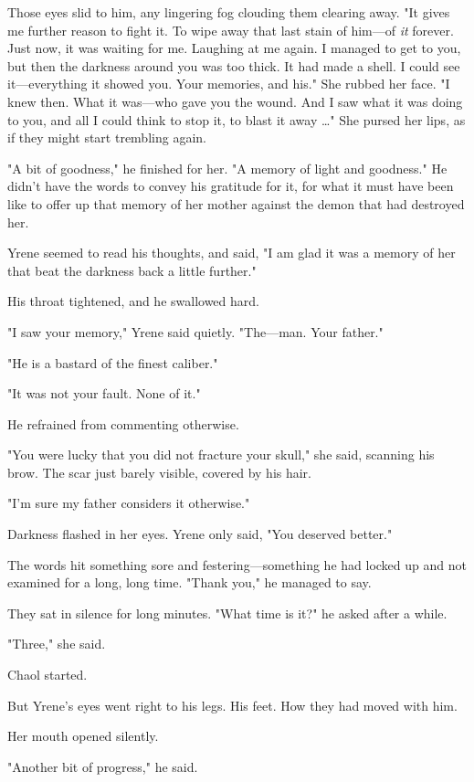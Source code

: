 Those eyes slid to him, any lingering fog clouding them clearing away. "It gives me further reason to fight it. To wipe away that last stain of him---of \emph{it} forever. Just now, it was waiting for me. Laughing at me again. I managed to get to you, but then the darkness around you was too thick. It had made a  shell. I could see it---everything it showed you. Your memories, and his." She rubbed her face. "I knew then. What it was---who gave you the wound. And I saw what it was doing to you, and all I could think to stop it, to blast it away \ldots" She pursed her lips, as if they might start trembling again.

"A bit of goodness," he finished for her. "A memory of light and goodness." He didn't have the words to convey his gratitude for it, for what it must have been like to offer up that memory of her mother against the demon that had destroyed her.

Yrene seemed to read his thoughts, and said, "I am glad it was a memory of her that beat the darkness back a little further."

His throat tightened, and he swallowed hard.

"I saw your memory," Yrene said quietly. "The---man. Your father."

"He is a bastard of the finest caliber."

"It was not your fault. None of it."

He refrained from commenting otherwise.

"You were lucky that you did not fracture your skull," she said, scanning his brow. The scar just barely visible, covered by his hair.

"I'm sure my father considers it otherwise."

Darkness flashed in her eyes. Yrene only said, "You deserved better."

The words hit something sore and festering---something he had locked up and not examined for a long, long time. "Thank you," he managed to say.

They sat in silence for long minutes. "What time is it?" he asked after a while.

"Three," she said.

Chaol started.

But Yrene's eyes went right to his legs. His feet. How they had moved with him.

Her mouth opened silently.

"Another bit of progress," he said.

